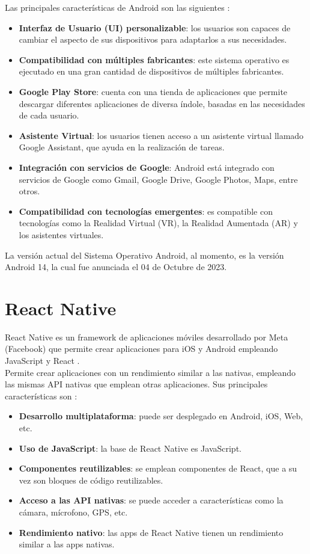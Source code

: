 Las principales características de Android son las siguientes \cite{ref57}:

\begin{itemize}

    \item \textbf{Interfaz de Usuario (UI) personalizable}: los usuarios son capaces de cambiar el aspecto de sus dispositivos para adaptarlos a sus necesidades.
    \item \textbf{Compatibilidad con múltiples fabricantes}: este sistema operativo es ejecutado en una gran cantidad de dispositivos de múltiples fabricantes.
    \item \textbf{Google Play Store}: cuenta con una tienda de aplicaciones que permite descargar diferentes aplicaciones de diversa índole, basadas en las necesidades de cada usuario.
    \item \textbf{Asistente Virtual}: los usuarios tienen acceso a un asistente virtual llamado Google Assistant, que ayuda en la realización de tareas.
    \item \textbf{Integración con servicios de Google}: Android está integrado con servicios de Google como Gmail, Google Drive, Google Photos, Maps, entre otros.
    \item \textbf{Compatibilidad con tecnologías emergentes}: es compatible con tecnologías como la Realidad Virtual (VR), la Realidad Aumentada (AR) y los asistentes virtuales. 
\end{itemize}

La versión actual del Sistema Operativo Android, al momento, es la versión Android 14, la cual fue anunciada el 04 de Octubre de 2023.

\newpage
\section{React Native}
React Native es un framework de aplicaciones móviles desarrollado por Meta (Facebook) que permite crear aplicaciones para iOS y Android empleando JavaScript y React \cite{ref59}.\\

Permite crear aplicaciones con un rendimiento similar a las nativas, empleando las mismas API nativas que emplean otras aplicaciones. Sus principales características son \cite{ref59}:

\begin{itemize}
    \item \textbf{Desarrollo multiplataforma}: puede ser desplegado en Android, iOS, Web, etc.
    \item \textbf{Uso de JavaScript}: la base de React Native es JavaScript.
    \item \textbf{Componentes reutilizables}: se emplean componentes de React, que a su vez son bloques de código reutilizables.
    \item \textbf{Acceso a las API nativas}: se puede acceder a características como la cámara, mícrofono, GPS, etc.
    \item \textbf{Rendimiento nativo}: las apps de React Native tienen un rendimiento similar a las apps nativas.
\end{itemize}


